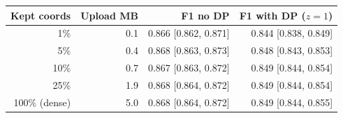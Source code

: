 \begin{tabular}{rrrr}
\toprule
Kept coords & Upload MB & F1 no DP & F1 with DP ($z{=}1$) \\
\midrule
1\% & 0.1 & 0.866 [0.862, 0.871] & 0.844 [0.838, 0.849] \\
5\% & 0.4 & 0.868 [0.863, 0.873] & 0.848 [0.843, 0.853] \\
10\% & 0.7 & 0.867 [0.863, 0.872] & 0.849 [0.844, 0.854] \\
25\% & 1.9 & 0.868 [0.864, 0.872] & 0.849 [0.844, 0.854] \\
100\% (dense) & 5.0 & 0.868 [0.864, 0.872] & 0.849 [0.844, 0.855] \\
\bottomrule
\end{tabular}
